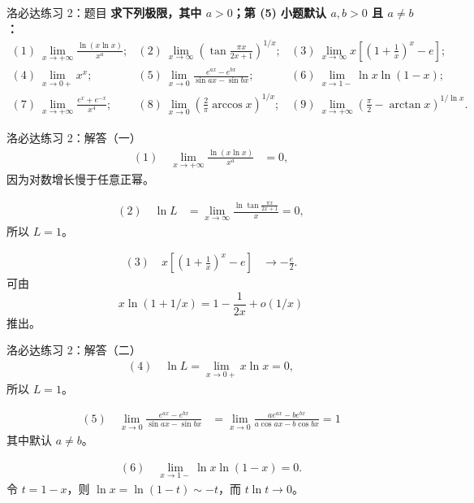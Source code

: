 \documentclass[aspectratio=169,11pt]{ctexbeamer}
\begin{document}
\begin{frame}{洛必达练习 2：题目}
\scriptsize
\textbf{求下列极限，其中 $a>0$；第 (5) 小题默认 $a,b>0$ 且 $a\ne b$：}
\[
\begin{array}{lll}
(1)\ \displaystyle\lim_{x\to+\infty}\frac{\ln(x\ln x)}{x^a};&
(2)\ \displaystyle\lim_{x\to\infty}\left(\tan\frac{\pi x}{2x+1}\right)^{1/x};&
(3)\ \displaystyle\lim_{x\to\infty}x\left[\left(1+\frac1x\right)^x-e\right];\\[1.2em]
(4)\ \displaystyle\lim_{x\to0+}x^x;&
(5)\ \displaystyle\lim_{x\to0}\frac{e^{ax}-e^{bx}}{\sin ax-\sin bx};&
(6)\ \displaystyle\lim_{x\to1-}\ln x\ln(1-x);\\[1.2em]
(7)\ \displaystyle\lim_{x\to+\infty}\frac{e^x+e^{-x}}{x^4};&
(8)\ \displaystyle\lim_{x\to0}\left(\frac2\pi\arccos x\right)^{1/x};&
(9)\ \displaystyle\lim_{x\to+\infty}\left(\frac\pi2-\arctan x\right)^{1/\ln x}.
\end{array}
\]
\end{frame}

\begin{frame}{洛必达练习 2：解答（一）}
\small
\[
\begin{aligned}
(1)\quad
\lim_{x\to+\infty}\frac{\ln(x\ln x)}{x^a}
&=0,
\end{aligned}
\]
因为对数增长慢于任意正幂。

\[
\begin{aligned}
(2)\quad
\ln L
&=\lim_{x\to\infty}\frac{\ln\tan\frac{\pi x}{2x+1}}{x}=0,
\end{aligned}
\]
所以 $L=1$。

\[
\begin{aligned}
(3)\quad
x\left[\left(1+\frac1x\right)^x-e\right]
&\to -\frac e2.
\end{aligned}
\]
可由
\[
  x\ln(1+1/x)=1-\frac1{2x}+o(1/x)
\]
推出。
\end{frame}

\begin{frame}{洛必达练习 2：解答（二）}
\small
\[
\begin{aligned}
(4)\quad
\ln L=\lim_{x\to0+}x\ln x=0,
\end{aligned}
\]
所以 $L=1$。

\[
\begin{aligned}
(5)\quad
\lim_{x\to0}\frac{e^{ax}-e^{bx}}{\sin ax-\sin bx}
&=\lim_{x\to0}
\frac{a e^{ax}-b e^{bx}}{a\cos ax-b\cos bx}=1
\end{aligned}
\]
其中默认 $a\ne b$。

\[
\begin{aligned}
(6)\quad
\lim_{x\to1-}\ln x\ln(1-x)=0.
\end{aligned}
\]
令 $t=1-x$，则 $\ln x=\ln(1-t)\sim -t$，而 $t\ln t\to0$。
\end{frame}
\end{document}
